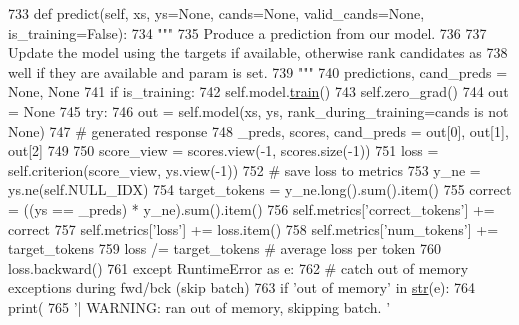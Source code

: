 \begin{DoxyCode}
733     \textcolor{keyword}{def }predict(self, xs, ys=None, cands=None, valid\_cands=None, is\_training=False):
734         \textcolor{stringliteral}{"""}
735 \textcolor{stringliteral}{        Produce a prediction from our model.}
736 \textcolor{stringliteral}{}
737 \textcolor{stringliteral}{        Update the model using the targets if available, otherwise rank candidates as}
738 \textcolor{stringliteral}{        well if they are available and param is set.}
739 \textcolor{stringliteral}{        """}
740         predictions, cand\_preds = \textcolor{keywordtype}{None}, \textcolor{keywordtype}{None}
741         \textcolor{keywordflow}{if} is\_training:
742             self.model.\hyperlink{namespaceprojects_1_1mastering__the__dungeon_1_1mturk_1_1tasks_1_1MTD_1_1run_a36a5f4f6f9df0611a6818610518d2cf0}{train}()
743             self.zero\_grad()
744             out = \textcolor{keywordtype}{None}
745             \textcolor{keywordflow}{try}:
746                 out = self.model(xs, ys, rank\_during\_training=cands \textcolor{keywordflow}{is} \textcolor{keywordflow}{not} \textcolor{keywordtype}{None})
747                 \textcolor{comment}{# generated response}
748                 \_preds, scores, cand\_preds = out[0], out[1], out[2]
749 
750                 score\_view = scores.view(-1, scores.size(-1))
751                 loss = self.criterion(score\_view, ys.view(-1))
752                 \textcolor{comment}{# save loss to metrics}
753                 y\_ne = ys.ne(self.NULL\_IDX)
754                 target\_tokens = y\_ne.long().sum().item()
755                 correct = ((ys == \_preds) * y\_ne).sum().item()
756                 self.metrics[\textcolor{stringliteral}{'correct\_tokens'}] += correct
757                 self.metrics[\textcolor{stringliteral}{'loss'}] += loss.item()
758                 self.metrics[\textcolor{stringliteral}{'num\_tokens'}] += target\_tokens
759                 loss /= target\_tokens  \textcolor{comment}{# average loss per token}
760                 loss.backward()
761             \textcolor{keywordflow}{except} RuntimeError \textcolor{keyword}{as} e:
762                 \textcolor{comment}{# catch out of memory exceptions during fwd/bck (skip batch)}
763                 \textcolor{keywordflow}{if} \textcolor{stringliteral}{'out of memory'} \textcolor{keywordflow}{in} \hyperlink{namespacegenerate__task__READMEs_a5b88452ffb87b78c8c85ececebafc09f}{str}(e):
764                     print(
765                         \textcolor{stringliteral}{'| WARNING: ran out of memory, skipping batch. '}

\end{DoxyCode}
